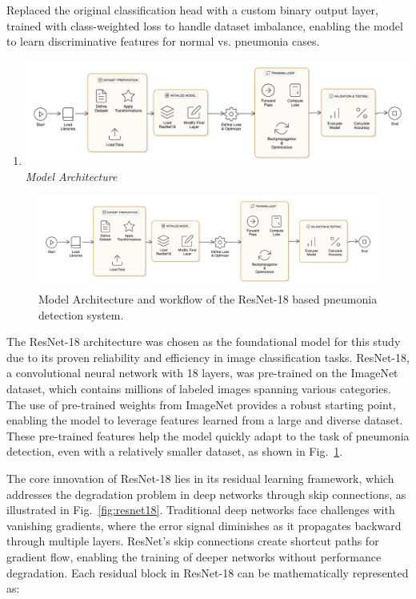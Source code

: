 \documentclass[
  twocolumn,
  10pt,
  a4paper,
  journal
]{IEEEtran}
\begin{document}
Replaced the original classification head with a custom binary output layer, trained with class-weighted loss to handle dataset imbalance, enabling the model to learn discriminative features for normal vs. pneumonia cases.

\begin{enumerate}
\def\labelenumi{\Alph{enumi}.}
\setcounter{enumi}{1}
\item
  \includegraphics[width=\columnwidth]{figures/figure1.png}\emph{Model
  Architecture}
\end{enumerate}

\begin{figure}[!t]
\centering
\includegraphics[width=\columnwidth]{figures/figure1.png}
\caption{Model Architecture and workflow of the ResNet-18 based pneumonia detection system.}
\label{fig:model_architecture}
\end{figure}

The ResNet-18 architecture was chosen as the foundational model for this study due to its proven reliability and efficiency in image classification tasks. ResNet-18, a convolutional neural network with 18 layers, was pre-trained on the ImageNet dataset, which contains millions of labeled images spanning various categories. The use of pre-trained weights from ImageNet provides a robust starting point, enabling the model to leverage features learned from a large and diverse dataset. These pre-trained features help the model quickly adapt to the task of pneumonia detection, even with a relatively smaller dataset, as shown in Fig.~\ref{fig:model_architecture}.

The core innovation of ResNet-18 lies in its residual learning framework, which addresses the degradation problem in deep networks through skip connections, as illustrated in Fig.~\ref{fig:resnet18}. Traditional deep networks face challenges with vanishing gradients, where the error signal diminishes as it propagates backward through multiple layers. ResNet's skip connections create shortcut paths for gradient flow, enabling the training of deeper networks without performance degradation. Each residual block in ResNet-18 can be mathematically represented as:
\end{document}
